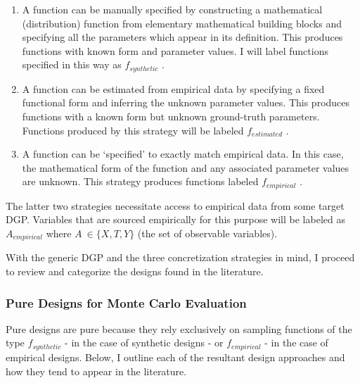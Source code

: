 \documentclass[../main.tex]{subfiles}
\begin{document}
\vspace{\baselineskip}
\begin{enumerate}
	\item A function can be manually specified by constructing a mathematical (distribution) function from elementary mathematical building blocks and specifying all the parameters which appear in its definition. This produces functions with known form and parameter values. I will label functions specified in this way as  \( f_{synthetic} \) . \par


\vspace{\baselineskip}
	\item A function can be estimated from empirical data by specifying a fixed functional form and inferring the unknown parameter values. This produces functions with a known form but unknown ground-truth parameters. Functions produced by this strategy will be labeled  \( f_{estimated} \) . \par


\vspace{\baselineskip}
	\item A function can be ‘specified’ to exactly match empirical data. In this case, the mathematical form of the function and any associated parameter values are unknown. This strategy produces functions labeled  \( f_{empirical} \) .
\end{enumerate}\par


\vspace{\baselineskip}
The latter two strategies necessitate access to empirical data from some target DGP. Variables that are sourced empirically for this purpose will be labeled as  \( A_{empirical} \)  where  \( A~ \in  \{ X, T, Y \}  \) (the set of observable variables).\par


\vspace{\baselineskip}
With the generic DGP and the three concretization strategies in mind, I proceed to review and categorize the designs found in the literature.\par

\subsubsection{Pure Designs for Monte Carlo Evaluation}

Pure designs are pure because they rely exclusively on sampling functions of the type  \( f_{synthetic} \)  - in the case of synthetic designs - or  \( f_{empirical} \) - in the case of empirical designs. Below, I outline each of the resultant design approaches and how they tend to appear in the literature.\par
\end{document}
